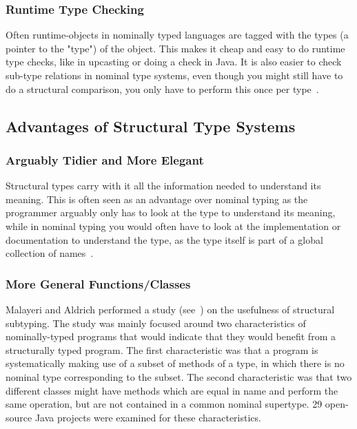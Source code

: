 \subsubsection{Runtime Type Checking}\label{subsubsec:runtime-type-checking}

Often runtime-objects in nominally typed languages are tagged with the types (a pointer to the "type") of the object.
This makes it cheap and easy to do runtime type checks, like in upcasting or doing a  check in Java.
It is also easier to check sub-type relations in nominal type systems, even though you might still have to do a structural comparison, you only have to perform this once per type~\cite{tapl}.

\subsection{Advantages of Structural Type Systems}\label{subsec:advantages-of-structural-types}

\subsubsection{Arguably Tidier and More Elegant}\label{subsubsec:tidier-and-more-elegant}


Structural types carry with it all the information needed to understand its meaning.
This is often seen as an advantage over nominal typing as the programmer arguably only has to look at the type to understand its meaning, while in nominal typing you would often have to look at the implementation or documentation to understand the type, as the type itself is part of a global collection of names~\cite{tapl}.

\subsubsection{More General Functions/Classes}\label{subsubsec:more-general-functions}

Malayeri and Aldrich performed a study (see~\cite{malayeri}) on the usefulness of structural subtyping.
The study was mainly focused around two characteristics of nominally-typed programs that would indicate that they would benefit from a structurally typed program.
The first characteristic was that a program is systematically making use of a subset of methods of a type, in which there is no nominal type corresponding to the subset.
The second characteristic was that two different classes might have methods which are equal in name and perform the same operation, but are not contained in a common nominal supertype.
29 open-source Java projects were examined for these characteristics.

